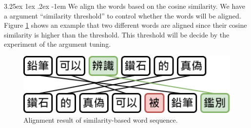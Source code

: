 \documentclass[12pt]{article}
\makeatletter
\renewcommand\paragraph{\@startsection{paragraph}{5}{\z@}%
  {3.25ex \@plus1ex \@minus.2ex}%
  {-1em}%
  {\normalfont\normalsize\bfseries}}
\makeatother
\begin{document}
\begin{CJK*}{UTF8}{bkai}
\begin{spacing}{1.77}

\paragraph{}
We align the words based on the cosine similarity. We have a argument ``similarity threshold'' to control whether the words will be aligned. Figure \ref{fig:sim_threshold} shows an example that two different words are aligned since their cosine similarity is higher than the threshold. This threshold will be decide by the experiment of the argument tuning.

\hspace*{-1.5in}
\begin{figure}[H]
  \centering
  \includegraphics[scale=0.6]{Threshold.png}
  \caption[SWS Alignment Result with Threshold]{Alignment result of similarity-based word sequence.}
  \label{fig:sim_threshold}
\end{figure}



\end{spacing}
\end{CJK*}
\end{document}
